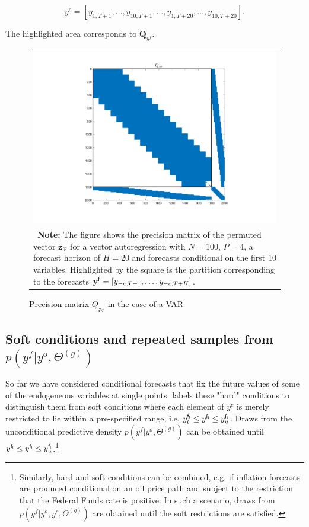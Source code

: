 \documentclass[notitlepage,a4paper,12pt]{article}
\begin{document}
$$y^c = [y_{1,T+1}, \dots, y_{10,T+1}, \dots, y_{1,T+20}, \dots, y_{10,T+20}].$$

The highlighted area corresponds to $\mathbf{Q}_{y^f}$.

\begin{figure}[htbp] \centering
    \caption{Precision matrix $Q_{\mathcal{z}_{\mathcal{P}}}$ in the case of a VAR \label{figQVAR}}
    \footnotesize
    \begin{tabular}{p{16cm}}
    \multicolumn{1}{c}{\includegraphics*[scale = 0.6]{../figures/fig_Qperm_VAR.pdf}} \\
    {
    \footnotesize \textbf{Note:} The figure shows the precision matrix of the permuted vector $\mathbf{z}_{\mathcal{P}}$ for a vector autoregression with  $N=100$, $P=4$, a forecast horizon of $H=20$ and forecasts conditional on the first 10 variables. Highlighted by the square is the partition corresponding to the forecasts $\mathbf{y}^{\sf{f}} = [y_{-c, T+1}, \dots, y_{-c, T+H}]$.
    }
    \end{tabular}
    \newline
    \normalsize
\end{figure}

\subsection{Soft conditions and repeated samples from $p(y^f|y^o, \Theta^{(g)})$}

So far we have considered conditional forecasts that fix the future values of some of the endogeneous variables at single points. \citet{waggonerzha1999_res} labels these "hard" conditions to distinguish them from soft conditions where each element of $y^c$ is merely restricted to lie within a pre-specified range, i.e. $y^{\sf{f}_l}_l \leq y^{\sf{f}_l} \leq y^{\sf{f}_l}_u$. Draws from the unconditional predictive density $p(y^f|y^o, \Theta^{(g)})$ can be obtained until $y^{\sf{f}_l} \leq y^{\sf{f}_l} \leq y^{\sf{f}_l}_u$.\footnote{Similarly, hard and soft conditions can be combined, e.g. if inflation forecasts are produced conditional on an oil price path and subject to the restriction that the Federal Funds rate is positive. In such a scenario, draws from $p(y^f|y^o, y^c, \Theta^{(g)})$ are obtained until the soft restrictions are satisfied.}\\
\end{document}
